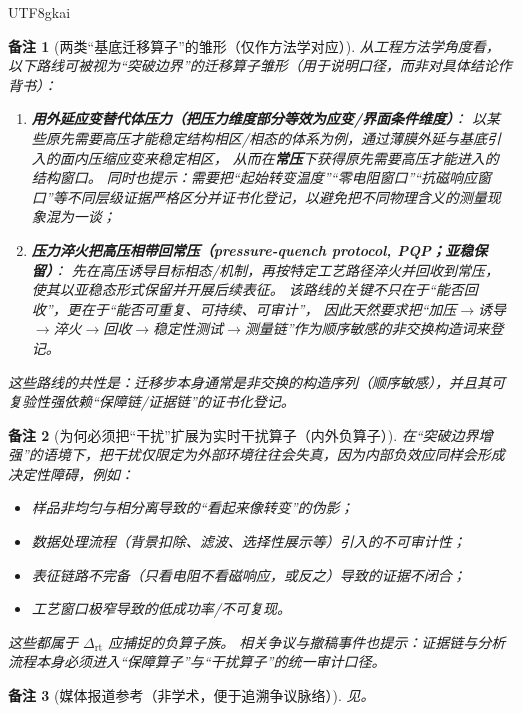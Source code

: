 \documentclass[12pt]{article}
\newtheorem{remark}{备注}[section]
\newcommand{\DeltaRT}{\ensuremath{\Delta_{\mathrm{rt}}}}
\begin{document}
\begin{CJK*}{UTF8}{gkai}
\begin{remark}[两类“基底迁移算子”的雏形（仅作方法学对应）]
从工程方法学角度看，以下路线可被视为“突破边界”的迁移算子雏形（用于说明口径，而非对具体结论作背书）：
\begin{enumerate}
  \item \textbf{用外延应变替代体压力（把压力维度部分等效为应变/界面条件维度）}：
	  以某些原先需要高压才能稳定结构相区/相态的体系为例，通过薄膜外延与基底引入的面内压缩应变来稳定相区，
	  从而在\textbf{常压}下获得原先需要高压才能进入的结构窗口。
	  同时也提示：需要把“起始转变温度”“零电阻窗口”“抗磁响应窗口”等不同层级证据严格区分并证书化登记，以避免把不同物理含义的测量现象混为一谈\cite{ref_slac_2025_room_pressure,
	    ref_nature_2025_08755_z}；
	  \item \textbf{压力淬火把高压相带回常压（pressure-quench protocol, PQP；亚稳保留）}：
	  先在高压诱导目标相态/机制，再按特定工艺路径淬火并回收到常压，使其以亚稳态形式保留并开展后续表征。
	  该路线的关键不只在于“能否回收”，更在于“能否可重复、可持续、可审计”，
	    因此天然要求把“加压$\to$诱导$\to$淬火$\to$回收$\to$稳定性测试$\to$测量链”作为顺序敏感的非交换构造词来登记\cite{ref_uh_2025_pqp}。
\end{enumerate}
这些路线的共性是：迁移步本身通常是非交换的构造序列（顺序敏感），并且其可复验性强依赖“保障链/证据链”的证书化登记。
\end{remark}

\begin{remark}[为何必须把“干扰”扩展为实时干扰算子（内外负算子）]
在“突破边界增强”的语境下，把干扰仅限定为外部环境往往会失真，因为内部负效应同样会形成决定性障碍，例如：
\begin{itemize}
  \item 样品非均匀与相分离导致的“看起来像转变”的伪影；
  \item 数据处理流程（背景扣除、滤波、选择性展示等）引入的不可审计性；
  \item 表征链路不完备（只看电阻不看磁响应，或反之）导致的证据不闭合；
  \item 工艺窗口极窄导致的低成功率/不可复现。
\end{itemize}
这些都属于 $\DeltaRT$ 应捕捉的负算子族。
相关争议与撤稿事件也提示：证据链与分析流程本身必须进入“保障算子”与“干扰算子”的统一审计口径\cite{ref_nature_2022_05294_9,ref_sciam_retraction_note}。
\end{remark}

\begin{remark}[媒体报道参考（非学术，便于追溯争议脉络）]
见\cite{ref_wsj_61288727,ref_wsj_aa2f9fd4,ref_time_ambient_superconductor}。
\end{remark}


\end{CJK*}
\end{document}
